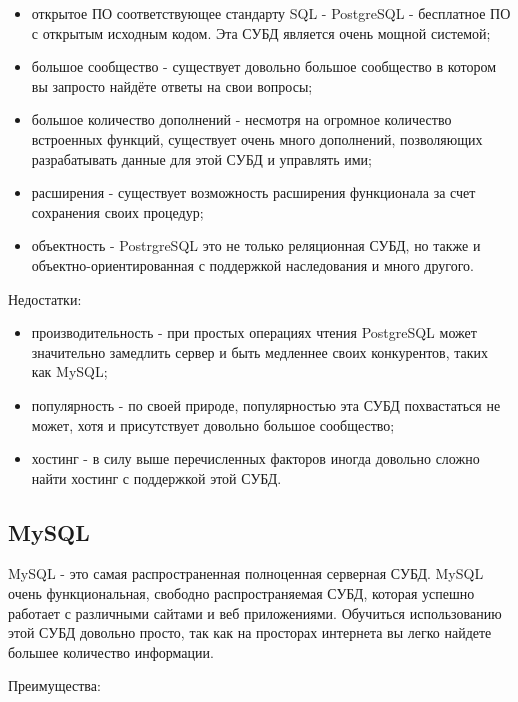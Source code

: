 \begin{itemize}
  \item открытое ПО соответствующее стандарту SQL - PostgreSQL - бесплатное ПО с открытым исходным кодом. Эта СУБД является очень мощной системой;
  \item большое сообщество - существует довольно большое сообщество в котором вы запросто найдёте ответы на свои вопросы;
  \item большое количество дополнений - несмотря на огромное количество встроенных функций, существует очень много дополнений, позволяющих разрабатывать данные для этой СУБД и управлять ими;
  \item расширения - существует возможность расширения функционала за счет сохранения своих процедур;
  \item объектность - PostrgreSQL это не только реляционная СУБД, но также и объектно-ориентированная с поддержкой наследования и много другого.
\end{itemize}

\hspace{0.6cm} Недостатки:

\begin{itemize}
  \item производительность - при простых операциях чтения PostgreSQL может значительно замедлить сервер и быть медленнее своих конкурентов, таких как MySQL;
  \item популярность - по своей природе, популярностью эта СУБД похвастаться не может, хотя и присутствует довольно большое сообщество;
  \item хостинг - в силу выше перечисленных факторов иногда довольно сложно найти хостинг с поддержкой этой СУБД.
\end{itemize}

\subsection{MySQL}

\hspace{0.6cm} MySQL - это самая распространенная полноценная серверная СУБД. MySQL очень функциональная, свободно распространяемая СУБД, которая успешно работает с различными сайтами и веб приложениями. Обучиться использованию этой СУБД довольно просто, так как на просторах интернета вы легко найдете большее количество информации\cite{web:SQLite}.

\hspace{0.6cm} Преимущества:

